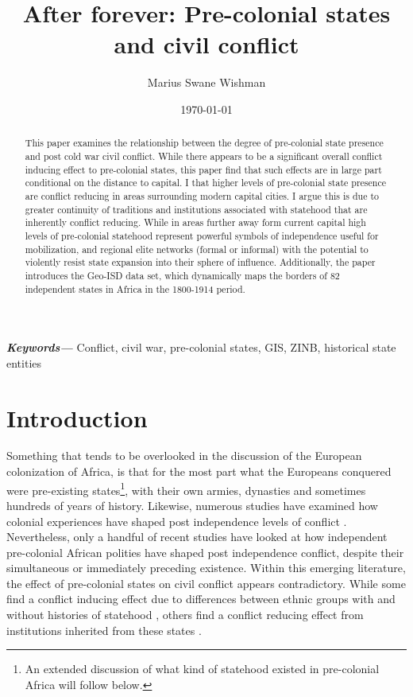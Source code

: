 \documentclass[12pt]{article}
\title{After forever: Pre-colonial states and civil conflict}
\author[1]{Marius Swane Wishman}
\affil[1]{Department of Sociology and Political Science, NTNU}
\date{\today}
\providecommand{\keywords}[1]
{
	\small	
	\textbf{\textit{Keywords---}} #1
}
\begin{document}
\maketitle

\begin{abstract}

This paper examines the relationship between the degree of pre-colonial state
presence and post cold war civil conflict. While there appears to be a
significant overall conflict inducing effect to pre-colonial states, this paper
find that such effects are in large part conditional on the distance to capital.
I that higher levels of pre-colonial state presence are conflict reducing in
areas surrounding modern capital cities. I argue this is due to greater
continuity of traditions and institutions associated with statehood that are
inherently conflict reducing. While in areas further away form current capital
high levels of pre-colonial statehood represent powerful symbols of independence
useful for mobilization, and regional elite networks (formal or informal) with
the potential to violently resist state expansion into their sphere of
influence. Additionally, the paper introduces the Geo-ISD data set, which
dynamically maps the borders of 82 independent states in Africa in the 1800-1914
period. 

\end{abstract}

\keywords{Conflict, civil war, pre-colonial states, GIS, ZINB, historical state
entities}


\onehalfspacing


\newpage

\section{Introduction}

Something that tends to be overlooked in the discussion of the European
colonization of Africa, is that for the most part what the Europeans conquered
were pre-existing states\footnote{An extended discussion of what kind of
statehood existed in pre-colonial Africa will follow below.}, with their own
armies, dynasties and sometimes hundreds of years of history. Likewise, numerous
studies have examined how colonial experiences have shaped post independence
levels of conflict \citep{achankeng2013conflict, Blanton_2001, carton2000blood,
Cohen_2014, Nunn2008, Wucherpfennig2016}. Nevertheless, only a handful of recent
studies have looked at how independent pre-colonial African polities have shaped
post independence conflict, despite their simultaneous or immediately preceding
existence. Within this emerging literature, the effect of pre-colonial states on
civil conflict appears contradictory. While some find a conflict inducing effect
due to differences between ethnic groups with and without histories of statehood
\citep{Englebert2002, Paine2019}, others find a conflict reducing effect from
institutions inherited from these states \citep{Depetris-Chauvin2016, Wig2016}.
\end{document}
